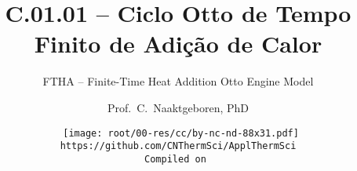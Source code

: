 \makeatletter
\immediate{} %
\makeatother


\title{C.01.01 -- Ciclo Otto de Tempo Finito de Adição de Calor}
\subtitle{FTHA -- Finite-Time Heat Addition Otto Engine Model}
\author{Prof.~C.~Naaktgeboren, PhD}
\date{{\scriptsize\tt%
    \texttt{[image: root/00-res/cc/by-nc-nd-88x31.pdf]}\\[\smallskipamount]
    https://github.com/CNThermSci/ApplThermSci\\
    Compiled on 
}}

\logo{%
    \parbox{158mm}{%
        \texttt{[image: root/00-res/UTFPR/UTFPR-logo-A.pdf]}\hfill%
        \texttt{[image: root/00-res/logo/CNThermSci-logo-A.pdf]}%
}} %
\frame{\titlepage}

\frame{\tableofcontents}

